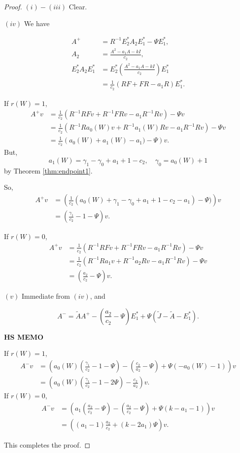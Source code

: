 \documentclass[
]{book}
\theoremstyle{definition}
\theoremstyle{definition}
\theoremstyle{definition}
\theoremstyle{definition}
\theoremstyle{remark}
\begin{document}
\begin{proof}
\leavevmode

\((i)-(iii)\) Clear.

\((iv)\) We have

\begin{align}
A^+ & = R^{-1}E^*_2A_2E^*_1 - \Psi E^*_1,\\
A_2 & = \frac{A^2-a_1A - kI}{c_2},\\
E^*_2A_2E^*_1 & = E^*_2\left(\frac{A^2-a_1A - kI}{c_2}\right)E^*_1\\
& = \frac{1}{c_2}(RF + FR - a_1R)E^*_1.
\end{align}

If \(r(W) = 1\),
\begin{align}
A^+v & = \frac{1}{c_2}(R^{-1}RFv + R^{-1}FRv - a_1R^{-1}Rv) - \Psi v\\
& = \frac{1}{c_2}(R^{-1}Ra_0(W)v + R^{-1}a_1(W)Rv - a_1R^{-1}Rv) - \Psi v\\
& = \frac{1}{c_2}\left(a_0(W) + a_1(W) - a_1) - \Psi\right)v.
\end{align}
But,
\[a_1(W) = \gamma_1 - \gamma_0 + a_1 + 1 - c_2, \quad \gamma_0 = a_0(W) + 1\]
by Theorem \ref{thm:endpoint1}.

So,
\begin{align}
A^+v & = \left(\frac{1}{c_2}(a_0(W) + \gamma_1 - \gamma_0 + a_1 + 1 - c_2 - a_1) - \Psi)\right)v\\
& = \left(\frac{\gamma_1}{c_2}-1-\Psi\right)v.
\end{align}

If \(r(W) = 0\),
\begin{align}
A^+v & = \frac{1}{c_2}(R^{-1}RFv + R^{-1}FRv - a_1R^{-1}Rv) - \Psi v\\
& = \frac{1}{c_2}(R^{-1}Ra_1v + R^{-1}a_2Rv - a_1R^{-1}Rv) - \Psi v\\
& = \left(\frac{a_2}{c_2}-\Psi\right)v.
\end{align}

\((v)\) Immediate from \((iv)\), and

\[A^- = \tilde{A}A^+ - \left(\frac{a_2}{c_2} - \Psi\right)E^*_1 + \Psi(\tilde{J}-\tilde{A}-E^*_1).\]

\textbf{HS MEMO}

If \(r(W) =1\),
\begin{align}
A^-v & = \left(a_0(W)\left(\frac{\gamma_1}{c_2}-1-\Psi\right) - \left(\frac{c_2}{a_2}-\Psi\right) + \Psi(-a_0(W)-1)\right) v\\
& = \left(a_0(W)\left(\frac{\gamma_1}{c_2}-1-2\Psi\right) - \frac{c_2}{a_2}\right)v.
\end{align}
If \(r(W) = 0\),
\begin{align}
A^-v & = \left(a_1\left(\frac{a_2}{c_2}-\Psi\right) - \left(\frac{a_2}{c_2}-\Psi\right) + \Psi(k-a_1-1)\right) v\\
& = \left((a_1-1)\frac{a_2}{c_2}+ (k-2a_1)\Psi\right)v.
\end{align}

This completes the proof.

\end{proof}
\end{document}
